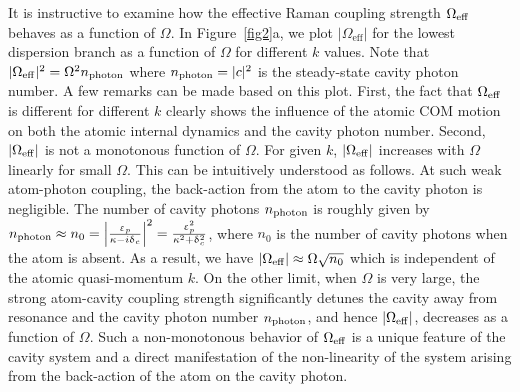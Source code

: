 \documentclass[atoms,article,accept,moreauthors,pdftex,12pt,a4paper]{mdpi}
\begin{document}
It is instructive to examine how the effective Raman coupling strength $\Omega_{\rm eff}$ behaves as a function of $\Omega$. In Figure~\ref{fig2}a, we plot $|\Omega_\text{eff}|$ for the lowest dispersion branch as a function of $\Omega$ for different $k$ values. Note that $|\Omega_{\rm eff}|^2 = \Omega^2 n_{\rm photon}$ where $n_{\rm photon}=|c|^2$ is the steady-state cavity photon number. A few remarks can be made based on this plot. First, the fact that $\Omega_{\rm eff}$ is different for different $k$ clearly shows the influence of the atomic COM motion on both the atomic internal dynamics and the cavity photon number. Second, $|\Omega_{\rm eff}|$ is not a monotonous function of $\Omega$. For given $k$, $|\Omega_{\rm eff}|$ increases with $\Omega$ linearly for small $\Omega$. This can be intuitively understood as follows. At such weak atom-photon coupling, the back-action from the atom to the cavity photon is negligible. The number of cavity photons $n_{\rm photon}$ is roughly given by $n_{\rm photon} \approx n_0=\left|\frac{\upvarepsilon_{p}}{\kappa-i\updelta_{c}}\right|^2= \frac{\upvarepsilon_p^2}{\kappa^2+ \updelta_c^2}$, where $n_0$ is the number of cavity photons when the atom is absent. As a result, we have $|\Omega_{\rm eff}| \approx \Omega \sqrt{n_0}$ which is independent of the atomic quasi-momentum $k$. On the other limit, when $\Omega$ is very large, the strong atom-cavity coupling strength significantly detunes the cavity away from resonance and the cavity photon number $n_{\rm photon}$, and hence $|\Omega_{\rm eff}|$, decreases as a function of $\Omega$. Such a non-monotonous behavior of $\Omega_{\rm eff}$ is a unique feature of the cavity system and a direct manifestation of the non-linearity of the system arising from the back-action of the atom on the cavity photon.
\end{document}
